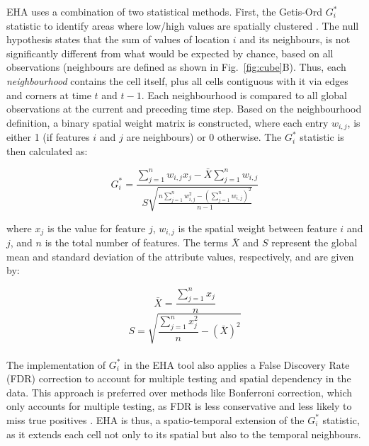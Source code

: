 EHA uses a combination of two statistical methods. First, the Getis-Ord \(G_i^*\) statistic to
identify areas where low/high values are spatially clustered \citep{getis_ord}. The null hypothesis
states that the sum of values of location \( i \) and its neighbours, is not significantly
different from what would be expected by chance, based on all observations (neighbours are defined
as shown in Fig.~\ref{fig:cube}B). Thus, each \textit{neighbourhood} contains the cell itself, plus
all cells contiguous with it via edges and corners at time \(t\) and \(t-1\). Each neighbourhood is
compared to all global observations at the current and preceding time step. Based on the
neighbourhood definition, a binary spatial weight matrix is constructed, where each entry
\(w_{i,j}\), is either 1 (if features \(i\) and \(j\) are neighbours) or 0 otherwise. The \(G_i^*\)
statistic is then calculated as:

\begin{equation}
	G_i^* = \frac{\displaystyle\sum_{j=1}^{n} w_{i,j} x_j - \bar{X} \displaystyle\sum_{j=1}^{n} w_{i,j}}{S \sqrt{\frac{n \displaystyle\sum_{j=1}^{n} w_{i,j}^2 - \left( \displaystyle\sum_{j=1}^{n} w_{i,j} \right)^2}{n-1}}}
\end{equation}

\bigskip

where \( x_j \) is the value for feature \( j \), \( w_{i,j} \) is the spatial weight between
feature \( i \) and \( j \), and \( n \) is the total number of features. The terms \( \bar{X} \)
and \( S \) represent the global mean and standard deviation of the attribute values, respectively,
and are given by:

\begin{equation}
	\bar{X} = \frac{\displaystyle\sum_{j=1}^{n} x_j}{n}
\end{equation}
\medskip
\begin{equation}
	S = \sqrt{\frac{\displaystyle\sum_{j=1}^{n} x_j^2}{n} - \left(\bar{X}\right)^2}
\end{equation}\\

The implementation of \(G_i^*\) in the EHA tool also applies a False Discovery Rate (FDR)
correction to account for multiple testing and spatial dependency in the data. This approach is
preferred over methods like Bonferroni correction, which only accounts for multiple testing, as FDR
is less conservative and less likely to miss true positives \citep{fdr_correction}. EHA is thus, a
spatio-temporal extension of the \(G_i^*\) statistic, as it extends each cell not only to its
spatial but also to the temporal neighbours.

